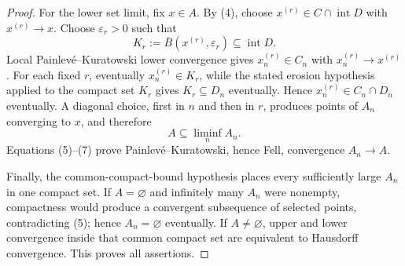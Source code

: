 \documentclass{article}
\begin{document}
\begin{proof}
For the lower set limit, fix \(x\in A\).  By (4), choose \(x^{(r)}\in C\cap\operatorname{int}D\) with \(x^{(r)}\to x\).  Choose \(\varepsilon_r>0\) such that
\[
 K_r:=\overline B(x^{(r)},\varepsilon_r)
 \subseteq\operatorname{int}D.
 \tag{6}
\]
Local Painlev\'e--Kuratowski lower convergence gives \(x_n^{(r)}\in C_n\) with \(x_n^{(r)}\to x^{(r)}\).  For each fixed \(r\), eventually \(x_n^{(r)}\in K_r\), while the stated erosion hypothesis applied to the compact set \(K_r\) gives \(K_r\subseteq D_n\) eventually.  Hence \(x_n^{(r)}\in C_n\cap D_n\) eventually.  A diagonal choice, first in \(n\) and then in \(r\), produces points of \(A_n\) converging to \(x\), and therefore
\[
 A\subseteq\liminf_nA_n.
 \tag{7}
\]
Equations (5)--(7) prove Painlev\'e--Kuratowski, hence Fell, convergence \(A_n\to A\).

Finally, the common-compact-bound hypothesis places every sufficiently large \(A_n\) in one compact set.  If \(A=\varnothing\) and infinitely many \(A_n\) were nonempty, compactness would produce a convergent subsequence of selected points, contradicting (5); hence \(A_n=\varnothing\) eventually.  If \(A\ne\varnothing\), upper and lower convergence inside that common compact set are equivalent to Hausdorff convergence.  This proves all assertions.
\end{proof}
\end{document}
